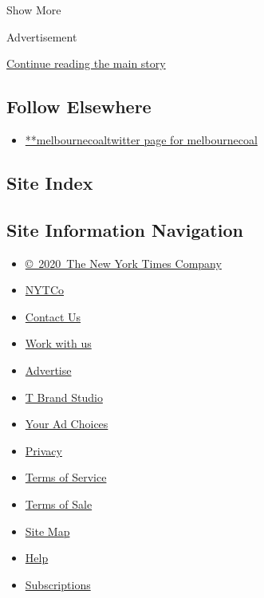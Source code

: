 Show More

Advertisement

\protect\hyperlink{after-mid2}{Continue reading the main story}

\hypertarget{follow-elsewhere}{%
\subsection{Follow Elsewhere}\label{follow-elsewhere}}

\begin{itemize}
\tightlist
\item
  \href{https://twitter.com/melbournecoal}{**melbournecoaltwitter page
  for melbournecoal}
\end{itemize}

\hypertarget{site-index}{%
\subsection{Site Index}\label{site-index}}

\hypertarget{site-information-navigation}{%
\subsection{Site Information
Navigation}\label{site-information-navigation}}

\begin{itemize}
\tightlist
\item
  \href{https://help.nytimes.com/hc/en-us/articles/115014792127-Copyright-notice}{©~2020~The
  New York Times Company}
\end{itemize}

\begin{itemize}
\tightlist
\item
  \href{https://www.nytco.com/}{NYTCo}
\item
  \href{https://help.nytimes.com/hc/en-us/articles/115015385887-Contact-Us}{Contact
  Us}
\item
  \href{https://www.nytco.com/careers/}{Work with us}
\item
  \href{https://nytmediakit.com/}{Advertise}
\item
  \href{http://www.tbrandstudio.com/}{T Brand Studio}
\item
  \href{https://www.nytimes.com/privacy/cookie-policy\#how-do-i-manage-trackers}{Your
  Ad Choices}
\item
  \href{https://www.nytimes.com/privacy}{Privacy}
\item
  \href{https://help.nytimes.com/hc/en-us/articles/115014893428-Terms-of-service}{Terms
  of Service}
\item
  \href{https://help.nytimes.com/hc/en-us/articles/115014893968-Terms-of-sale}{Terms
  of Sale}
\item
  \href{https://spiderbites.nytimes.com}{Site Map}
\item
  \href{https://help.nytimes.com/hc/en-us}{Help}
\item
  \href{https://www.nytimes.com/subscription?campaignId=37WXW}{Subscriptions}
\end{itemize}

